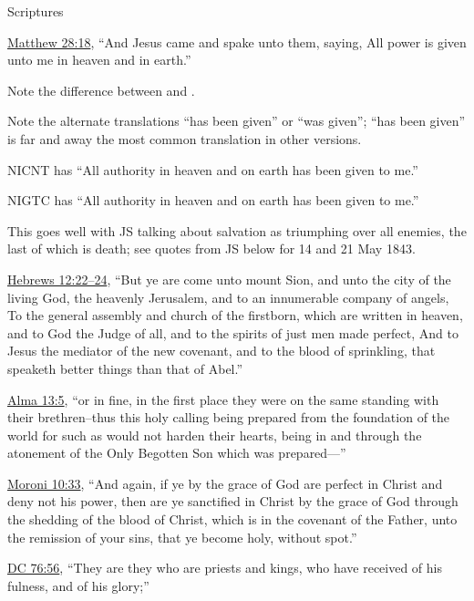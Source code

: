 \begin{compactitem}
			\item Scriptures
				\begin{compactitem}
					\item \hyperref[MATTHEW-28-18]{Matthew 28:18}, ``And Jesus came and spake unto them, saying, All power is given unto me	in heaven and in earth.''
						\begin{compactitem}
							\item Note the difference between  and .
							\item Note the alternate translations ``has been given'' or ``was given''; ``has been given'' is far and away the most common translation in other versions.
							\item NICNT has ``All authority in heaven and on earth has been given to me.''
							\item NIGTC has ``All authority in heaven and on earth has been given to me.''
							\item This goes well with JS talking about salvation as triumphing over all enemies, the last of which is death; see quotes from JS below for 14 and 21 May 1843.
						\end{compactitem}
					\item \hyperref[HEBREWS-12-22]{Hebrews 12:22--24}, ``But ye are come unto mount Sion, and unto the city of the living God, the heavenly Jerusalem, and to an innumerable company of angels, To the general assembly and church of the firstborn, which are written in heaven, and to God the Judge of all, and to the spirits of just men made perfect, And to Jesus the mediator of the new covenant, and to the blood of sprinkling, that speaketh better things than that of Abel.''
					\item \hyperref[ALMA-13-5]{Alma 13:5}, ``or in fine, in the first place they were on the same standing with their brethren--thus this holy calling being prepared from the foundation of the world for such as would not harden their hearts, being in and through the atonement of the Only Begotten Son which was prepared---''
					\item \hyperref[MORONI-10-33]{Moroni 10:33}, ``And again, if ye by the grace of God are perfect in Christ and deny not his power, then are ye sanctified in Christ by the grace of God through the shedding of the blood of Christ, which is in the covenant of the Father, unto the remission of your sins, that ye become holy, without spot.''
					\item \hyperref[DC76-56]{DC 76:56}, ``They are they who are priests and kings, who have received of his fulness, and of his glory;''

\end{compactitem}
\end{compactitem}
